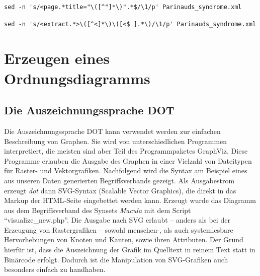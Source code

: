 \documentclass[pagesize,paper=A4,DIV=calc,fontsize=12pt,draft=false]{scrreprt}
\begin{document}
\lstset{
language=bash
}

\begin{lstlisting}[caption={Extraktion des Titels aus Zeile 5 des Artikels \enquote{Parinaud's syndrome}. HTML-Entities wie \texttt{\&\#39;} für hochgestellte einzelne Anführungszeichen in Zeile 5 wurden gesammelt und in der Ergebnisdatei ersetzt.}]
sed -n 's/<page.*title="\([^"]*\)".*$/\1/p' Parinauds_syndrome.xml
\end{lstlisting}

\begin{lstlisting}[caption={Extraktion des Textes aus der der Zeile 10 nachfolgenden Zeile des Artikels \enquote{Parinaud's syndrome}}]
sed -n 's/<extract.*>\([^<]*\)\([<$ ].*\)/\1/p' Parinauds_syndrome.xml
\end{lstlisting}



\section{Erzeugen eines Ordnungsdiagramms}

\subsection{Die Auszeichnungssprache DOT}

Die Auszeichnungssprache DOT kann verwendet werden zur einfachen Beschreibung von Graphen.
Sie wird von unterschiedlichen Programmen interpretiert, die meisten sind aber Teil des Programmpaketes GraphViz.
Diese Programme erlauben die Ausgabe des Graphen in einer Vielzahl von Dateitypen für Raster- und Vektorgrafiken.
Nachfolgend wird die Syntax am Beispiel eines aus unseren Daten generierten Begriffsverbands gezeigt.
Als Ausgabestrom erzeugt \emph{dot} dann SVG-Syntax (Scalable Vector Graphics), die direkt in das Markup der HTML-Seite eingebettet werden kann.
Erzeugt wurde das Diagramm aus dem Begriffsverband des Synsets \emph{Macula} mit dem Script \enquote{visualize\_new.php}. 
Die Ausgabe nach SVG erlaubt -- anders als bei der Erzeugung von Rastergrafiken -- sowohl menschen-, als auch systemlesbare Hervorhebungen von Knoten und Kanten, sowie ihren Attributen.
Der Grund hierfür ist, dass die Auszeichnung der Grafik im Quelltext in reinem Text statt in Binärcode erfolgt. 
Dadurch ist die Manipulation von SVG-Grafiken auch besonders einfach zu handhaben.
\end{document}
